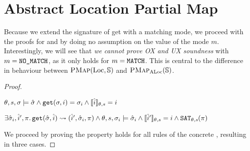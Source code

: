 \section{Abstract Location Partial Map} \label{proofs:alocpmap-soundness}

Because we extend the signature of get with a matching mode, we proceed with the proofs for  and  by doing no assumption on the value of the mode $m$. Interestingly, we will see that \emph{we cannot prove OX and UX soundness} with $m=\texttt{NO\_MATCH}$, as it only holds for $m=\texttt{MATCH}$. This is central to the difference in behaviour between $\textsc{PMap}(\text{Loc}, \mathbb S)$ and $\textsc{PMap}_{\text{ALoc}}(\mathbb S)$.

\begin{proof}


\pfassume \begin{hypvlist}
 $\theta,s,\sigma \models \hat{\sigma} \land \texttt{get}(\sigma, i)=\sigma_i \land \llbracket\hat{i}\rrbracket_{\theta,s}=i$
\end{hypvlist}
\pfprove \begin{goalvlist}
 $\exists \hat{\sigma}_i, \hat{i}', \pi \ldotp \texttt{get}(\hat{\sigma},\hat{i})\rightsquigarrow(\hat{i}', \hat{\sigma}_i, \pi) \land \theta,s,\sigma_i\models\hat{\sigma}_i \land \llbracket\hat{i}'\rrbracket_{\theta,s}=i \land \texttt{SAT}_{\mathit{\theta,s}}(\pi)$
\end{goalvlist}

We proceed by proving the property holds for all rules of the concrete , resulting in three cases.



\end{proof}
